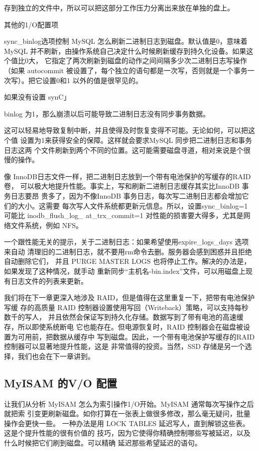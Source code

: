 存到独立的文件中，所以可以把这部分工作压力分离出来放在单独的盘上。

其他的1/O配置项

sync\_binlog选项控制 MySQL 怎么刷新二进制日志到磁盘。默认值是0，意味着MySQL
并不刷新，由操作系统自己决定什么时候刷新缓存到持久化设备。如果这个值比0大，
它指定了两次刷新到磁盘的动作之间间隔多少次二进制日志写操作（如果 autocommit
被设置了，每个独立的语句都是一次写，否则就是一个事务一次写）。把它设置0和1
以外的值是很罕见的。

如果没有设置 synC」

binlog 为1，那么崩溃以后可能导致二进制日志没有同步事务数据。

这可以轻易地导致复制中断，并且使得及时恢复变得不可能。无论如何，可以把这个值
设置为1来获得安全的保障。这样就会要求MySQL 同步把二进制日志和事务日志这两
个文件刷新到两个不同的位置。这可能需要磁盘寻道，相对来说是个很慢的操作。

像 InnoDB日志文件一样，把二进制日志放到一个带有电池保护的写缓存的RAID 卷，
可以极大地提升性能。事实上，写和刷新二进制日志缓存其实比InnoDB 事务日志要昂
贵多了，因为不像InnoDB 事务日志，每次写二进制日志都会增加它们的大小。这需要
每次写人文件系统都更新元信息。所以，设置sync\_binlog=1 可能比 inodb\_flush\_log\_
at\_trx\_commit=1 对性能的损害要大得多，尤其是网络文件系统，例如 NFS。

一个跟性能无关的提示，关于二进制日志：如果希望使用expire\_logs\_days 选项来自动
清理旧的二进制日志，就不要用rm命令去删。服务器会感到困惑并且拒绝自动删除它们，
并且 PURGE MASTER LOGS 也将停止工作。解决的办法是，如果发现了这种情况，就手动
重新同步“主机名-bin.index”文件，可以用磁盘上现有日志文件的列表来更新。

我们将在下一章更深入地涉及 RAID，但是值得在这里重复一下，把带有电池保护写缓
存的高质量 RAID 控制器设置使用写回（Writeback）策略，可以支持每秒数千的写人，
并且依然会保证写到持久化存储。数据写到了带有电池的高速缓存，所以即使系统断电
它也能存在。但电源恢复时，RAID 控制器会在磁盘被设置为可用前，把数据从缓存中
写到磁盘。因此，一个带有电池保护写缓存的RAID 控制器可以显著地提升性能，这是
非常值得的投资。当然，SSD 存储是另一个选择，我们也会在下一章讲到。

\subsection{MyISAM 的V/O 配置}
让我们从分析 MyISAM 怎么为索引操作1/O开始。MyISAM 通常每次写操作之后就把索
引变更刷新磁盘。如你打算在一张表上做很多修改，那么毫无疑问，批量操作会更快一些。
一种办法是用 LOCK TABLES 延迟写人，直到解锁这些表。这是个提升性能的很有价值的
技巧，因为它使得你精确控制哪些写被延迟，以及什么时候把它们刷到磁盘。可以精确
延迟那些希望延迟的语句。

